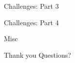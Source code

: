 \documentclass[notes, xcolor = dvipsnames]{beamer}
\begin{document}
    \begin{frame}{Challenges: Part 3}




    \end{frame}

    \begin{frame}{Challenges: Part 4}




    \end{frame}

    \begin{frame}{Misc}

    \end{frame}

    \begin{frame}{Thank you}
        Questions?
    \end{frame}
\end{document}
